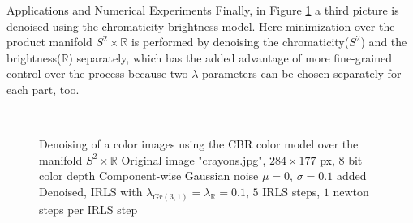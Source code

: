 \begin{chapter}{Applications and Numerical Experiments}
Finally, in Figure \ref{fig:application_color3} a third picture is denoised using the chromaticity-brightness model. Here minimization over the product manifold
$S^2\times \mathbb{R}$ is performed by denoising the chromaticity($S^2$) and the brightness($\mathbb{R}$) separately, which has the added advantage of more 
fine-grained control over the process because two $\lambda$ parameters can be chosen separately for each part, too.

\begin{figure}[h!]
    \centering
    \\
    \caption[Large image "crayons" CBR-vectorial denoising]{Denoising of a color images using the CBR color model over the manifold $S^2\times\mathbb{R}$
	 Original image "crayons.jpg", $284\times 177$ px, 8 bit color depth
	 Component-wise Gaussian noise $\mu=0$, $\sigma=0.1$ added
	 Denoised, IRLS with $\lambda_{Gr(3,1)}=\lambda_{\mathbb{R}}=0.1$, $5$ IRLS steps, $1$ newton steps per IRLS step
	\label{fig:application_color3}
    }
\end{figure}


\end{chapter}

